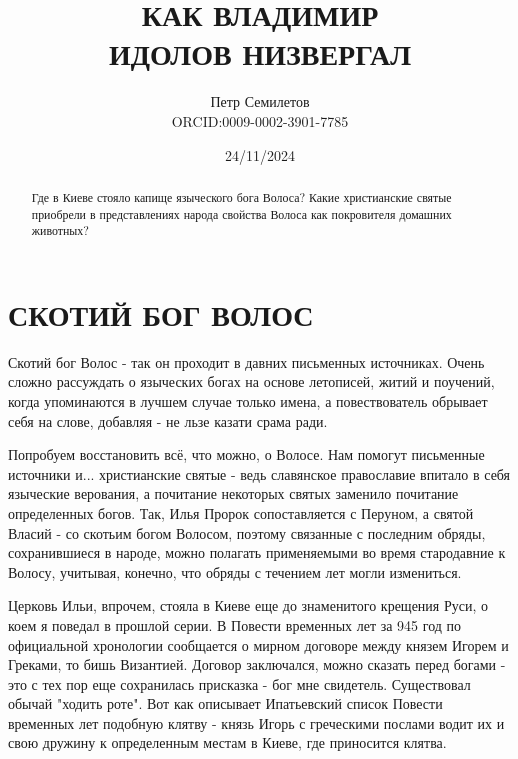 \documentclass[a5paper,11pt,openany]{article}
\title{КАК ВЛАДИМИР\\  ИДОЛОВ НИЗВЕРГАЛ\\
\textsmaller[2]{редакция 1.0}}
\author{Петр Семилетов\\ORCID:0009-0002-3901-7785 \orcidlink{0009-0002-3901-7785}}
\date{24/11/2024}
\begin{document}
\maketitle

\pagestyle{empty}


\newpage

\pagestyle{plain}



%
%
%

\begin{abstract}

   Где в Киеве стояло капище языческого бога Волоса? Какие христианские святые приобрели в представлениях народа свойства Волоса как покровителя домашних животных?
\end{abstract}


\section{СКОТИЙ БОГ ВОЛОС}

   Скотий бог Волос - так он проходит в давних письменных источниках. Очень сложно рассуждать о языческих богах на основе летописей, житий и поучений, когда упоминаются в лучшем случае только имена, а повествователь обрывает себя на слове, добавляя - не льзе казати срама ради.

   Попробуем восстановить всё, что можно, о Волосе. Нам помогут письменные источники и... христианские святые - ведь славянское православие впитало в себя языческие верования, а почитание некоторых святых заменило почитание определенных богов. Так, Илья Пророк сопоставляется с Перуном, а святой Власий - со скотьим богом Волосом, поэтому связанные с последним обряды, сохранившиеся в народе, можно полагать применяемыми во время стародавние к Волосу, учитывая, конечно, что обряды с течением лет могли измениться. 

   Церковь Ильи, впрочем, стояла в Киеве еще до знаменитого крещения Руси, о коем я поведал в прошлой серии. В Повести временных лет за 945 год по официальной хронологии сообщается о мирном договоре между князем Игорем и Греками, то бишь Византией. Договор заключался, можно сказать перед богами - это с тех пор еще сохранилась присказка - бог мне свидетель. Существовал обычай "ходить роте". Вот как описывает Ипатьевский список Повести временных лет подобную клятву - князь Игорь с греческими послами водит их и свою дружину к определенным местам в Киеве, где приносится клятва.
\end{document}
